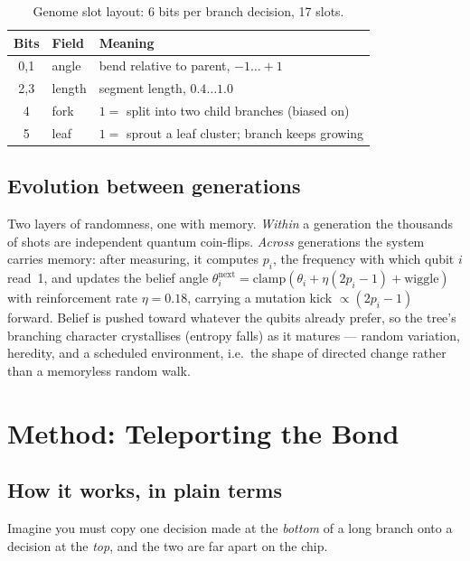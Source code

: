 \documentclass[conference]{IEEEtran}
\begin{document}
\begin{table}[H]
\caption{Genome slot layout: 6 bits per branch decision, 17 slots.}
\label{tab:genome}
\centering
\small
\begin{tabular}{@{}cll@{}}
\toprule
\textbf{Bits} & \textbf{Field} & \textbf{Meaning}\\
\midrule
0,1 & angle  & bend relative to parent, $-1\ldots+1$\\
2,3 & length & segment length, $0.4\ldots1.0$\\
4   & fork   & $1=$ split into two child branches (biased on)\\
5   & leaf   & $1=$ sprout a leaf cluster; branch keeps growing\\
\bottomrule
\end{tabular}
\end{table}

\subsection{Evolution between generations}

Two layers of randomness, one with memory. \emph{Within} a generation the thousands of
shots are independent quantum coin-flips. \emph{Across} generations the system carries
memory: after measuring, it computes $p_i$, the frequency with which qubit $i$ read~1, and
updates the belief angle $\theta_i^{\text{next}} = \mathrm{clamp}(\theta_i + \eta(2p_i-1) +
\text{wiggle})$ with reinforcement rate $\eta=0.18$, carrying a mutation kick
$\propto(2p_i-1)$ forward. Belief is pushed toward whatever the qubits already prefer, so
the tree's branching character crystallises (entropy falls) as it matures --- random
variation, heredity, and a scheduled environment, i.e.\ the shape of directed change
rather than a memoryless random walk.

\section{Method: Teleporting the Bond}
\label{sec:method}

\subsection{How it works, in plain terms}

Imagine you must copy one decision made at the \emph{bottom} of a long branch onto a
decision at the \emph{top}, and the two are far apart on the chip.
\end{document}
